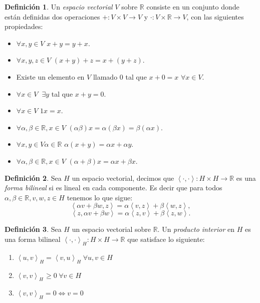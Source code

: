 \documentclass[12pt,spanish,oneside]{book}
\theoremstyle{plain}
\numberwithin{equation}{chapter}
\theoremstyle{definition}
\newtheorem{defi}{Definici\'{o}n}[chapter]
\theoremstyle{remark}
\newcommand{\re}{\mathbb{R}}
\begin{document}
\begin{defi}

Un \textit{espacio vectorial} $V$ sobre $\re$ consiste en un conjunto donde están definidas dos operaciones $+:V\times V\rightarrow V$ y $\cdot : V\times \re \rightarrow V$, con las siguientes propiedades:
\begin{itemize}
\item $\forall x,y \in V$ $x+y=y+x.$

\item $\forall x,y,z \in V$ $(x+y)+z=x+(y+z).$

\item Existe un elemento en $V$ llamado 0 tal que $x+0=x$ $\forall x\in V. $

\item $\forall x \in V\phantom{\pi}\exists y $ tal que $x+y=0.$

\item $\forall x \in V$ $1x=x.$

\item $ \forall \alpha ,\beta \in \re ,x\in V$ $ (\alpha \beta )x = \alpha (\beta x) = \beta (\alpha x).$

\item $\forall x,y\in V \alpha \in \re$ $ \alpha (x+y)= \alpha x +\alpha y .$

\item $\forall \alpha ,\beta \in \re ,x\in V$ $ (\alpha+\beta)x =\alpha x+ \beta x.$


\end{itemize}

\end{defi}
\begin{defi}
Sea $H$ un espacio vectorial, decimos que $\left<\cdot,\cdot\right>:H\times H \longrightarrow \re$ es una \textit{forma bilineal } si es lineal en cada componente. Es decir que para todos $\alpha,\beta\in \re, v,w,z\in H$ tenemos lo que sigue: 
\[ \left<\alpha v+ \beta w,z\right>= \alpha\left<v,z\right>+\beta \left<w,z\right>, \]
\[ \left<z,\alpha v+ \beta w\right>= \alpha\left<z,v\right>+\beta \left<z,w\right>. \]
\end{defi}

\begin{defi}
Sea $H$ un espacio vectorial sobre $\re$. Un \textit{producto interior} en $H$ es una forma bilineal $\left<\cdot,\cdot\right>_H:H\times H \longrightarrow \re$ que satisface lo siguiente: 

\begin{enumerate}
\item $\left<u,v\right>_H=\left<v,u\right>_H \hspace{3pt} \forall u,v \in H$ 
\item $\left<v,v\right>_H \hspace{1pt}\geq 0\hspace{3pt} \forall v\in H$
\item $\left<v,v\right>_H =0 \iff v=0$
\end{enumerate}
\end{defi}
\end{document}
